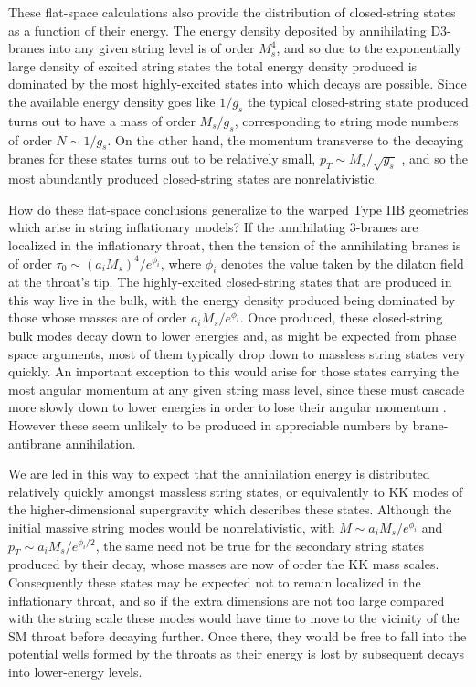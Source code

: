 \documentclass[12pt]{JHEP3}
\newcommand{\sss}{\scriptscriptstyle}
\begin{document}
These flat-space calculations also provide the distribution of
closed-string states as a function of their energy. The energy
density deposited by annihilating D3-branes into any given string
level is of order $M_s^4$, and so due to the exponentially large
density of excited string states the total energy density produced
is dominated by the most highly-excited states into which decays
are possible. Since the available energy density goes like $1/g_s$
the typical closed-string state produced turns out to have a mass
of order $M_s/g_s$, corresponding to string mode numbers of order
$N \sim 1/g_s$. On the other hand, the momentum transverse to the
decaying branes for these states turns out to be relatively small,
$p_{\sss T} \sim M_s/\sqrt{g_s}$ \cite{BraneDecay,Sen-review}, and
so the most abundantly produced closed-string states are
nonrelativistic.

How do these flat-space conclusions generalize to the warped Type
IIB geometries which arise in string inflationary models? If the
annihilating 3-branes are localized in the inflationary throat,
then the tension of the annihilating branes is of order $\tau_0
\sim (a_i M_s)^4/e^{\phi_i}$, where $\phi_i$ denotes the value
taken by the dilaton field at the throat's tip. The highly-excited
closed-string states that are produced in this way live in the
bulk, with the energy density produced being dominated by those
whose masses are of order $a_i M_s/e^{\phi_i}$. Once produced,
these closed-string bulk modes decay down to lower energies and,
as might be expected from phase space arguments, most of them
typically drop down to massless string states very quickly. An
important exception to this would arise for those states carrying
the most angular momentum at any given string mass level, since
these must cascade more slowly down to lower energies in order to
lose their angular momentum \cite{HiJCascade}. However these seem
unlikely to be produced in appreciable numbers by brane-antibrane
annihilation.

We are led in this way to expect that the annihilation energy is
distributed relatively quickly amongst massless string states, or
equivalently to KK modes of the higher-dimensional supergravity
which describes these states. Although the initial massive string
modes would be nonrelativistic, with $M \sim a_i M_s/e^{\phi_i}$
and $p_{\sss T} \sim a_i M_s/e^{\phi_i/2}$, the same need not be
true for the secondary string states produced by their decay,
whose masses are now of order the KK mass scales. Consequently
these states may be expected not to remain localized in the
inflationary throat, and so if the extra dimensions are not too
large compared with the string scale these modes would have time
to move to the vicinity of the SM throat before decaying further.
Once there, they would be free to fall into the potential wells
formed by the throats as their energy is lost by subsequent decays
into lower-energy levels.
\end{document}
